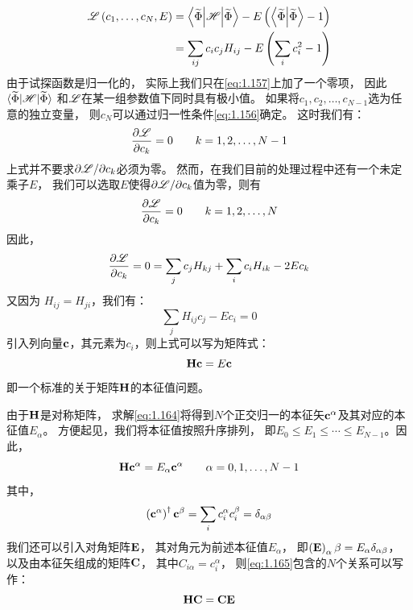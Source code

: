 \begin{equation}
 \begin{split}
     \mathscr{L}\left(c_1, \dots, c_N, E\right) &= \left\langle \widetilde\Phi\middle\vert \mathscr{H} \middle\vert \widetilde\Phi\right\rangle - E\left(\left\langle \widetilde\Phi \middle\vert \widetilde\Phi \right\rangle - 1\right) \\
     &= \sum_{ij} c_ic_jH_{ij} - E\left(\sum_i c_i^2 -1\right)
 \end{split}
 \label{eq:1.159}
\end{equation}
由于试探函数是归一化的，
实际上我们只在\autoref{eq:1.157}上加了一个零项，
因此$\langle \widetilde\Phi\vert \mathscr{H} \vert \widetilde\Phi\rangle$ 和$\mathscr{L}$在某一组参数值下同时具有极小值。
如果将$c_1, c_2, \dots, c_{N-1}$选为任意的独立变量，
则$c_N$可以通过归一性条件\autoref{eq:1.156}确定。
这时我们有：
\begin{equation}
 \frac{\partial \mathscr{L}}{\partial c_k} = 0 \qquad k = 1, 2, \dots, N-1
 \label{eq:1.160}
\end{equation}
上式并不要求$\partial\mathscr{L}/\partial{c_k}$必须为零。
然而，在我们目前的处理过程中还有一个未定乘子$E$，
我们可以选取$E$使得$\partial\mathscr{L}/\partial{c_k}$值为零，则有
\begin{equation}
 \frac{\partial \mathscr{L}}{\partial c_k} = 0 \qquad k = 1, 2, \dots, N
 \label{eq:1.161}
\end{equation}
因此，
\begin{equation}
 \frac{\partial \mathscr{L}}{\partial c_k} = 0 = \sum_j c_j H_{kj} + \sum_i c_i H_{ik} - 2 E c_k
 \label{eq:1.162}
\end{equation}
又因为 $H_{ij} = H_{ji}$，我们有：
\begin{equation}
 \sum_j H_{ij}c_j - Ec_i = 0
 \label{eq:1.163}
\end{equation}
引入列向量$\mathbf c$，其元素为$c_i$，则上式可以写为矩阵式：
\begin{equation}
 \mathbf{H}\mathbf{c} = E \mathbf{c}
 \label{eq:1.164}
\end{equation}
即一个标准的关于矩阵$\mathbf{H}$的本征值问题。

由于$\mathbf{H}$是对称矩阵，
求解\autoref{eq:1.164}将得到$N$个正交归一的本征矢$\mathbf{c}^\alpha$及其对应的本征值$E_\alpha$。
方便起见，我们将本征值按照升序排列，
即$E_0 \leq E_1 \leq \cdots \leq E_{N-1}$。因此，
\begin{equation}
 \mathbf{H}\mathbf{c}^\alpha = E_\alpha \mathbf{c}^\alpha\qquad \alpha = 0, 1, \dots, N-1
 \label{eq:1.165}
\end{equation}
其中，
\begin{equation}
 \left(\mathbf{c}^\alpha\right)^\dagger\mathbf{c}^\beta = \sum_i c_i^\alpha c_i^\beta = \delta_{\alpha\beta}
 \label{eq:1.166}
\end{equation}
我们还可以引入对角矩阵$\mathbf{E}$，
其对角元为前述本征值$E_\alpha$，
即$\left(\mathbf{E}\right)_\alpha\beta = E_\alpha\delta_{\alpha\beta}$，
以及由本征矢组成的矩阵$\mathbf{C}$，
其中$C_{i\alpha} = c_i^\alpha$，
则\autoref{eq:1.165}包含的$N$个关系可以写作：
\begin{equation}
 \mathbf{H}\mathbf{C} = \mathbf{C}\mathbf{E}
 \label{eq:1.167}
\end{equation}

